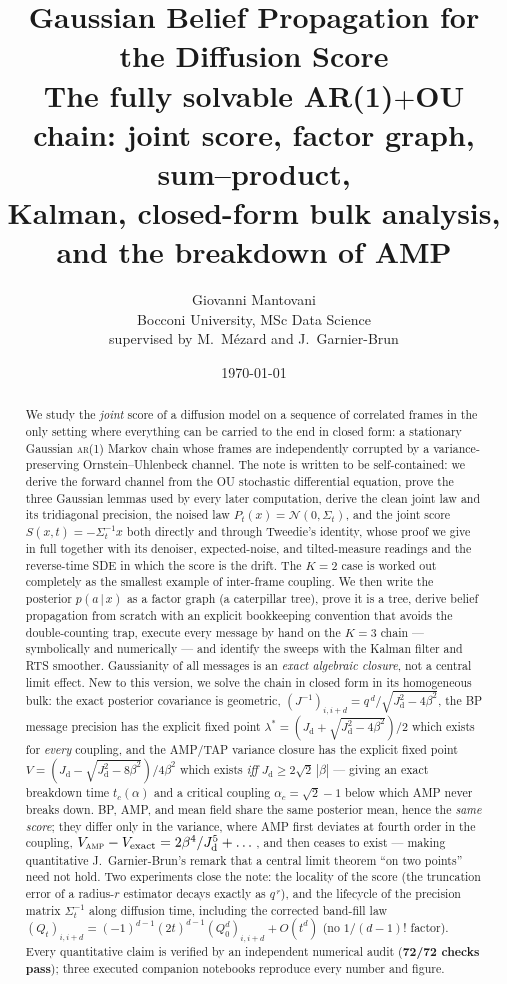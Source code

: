 \documentclass[11pt]{article}
\title{\bfseries Gaussian Belief Propagation for the Diffusion Score\\[2pt]
\large The fully solvable AR(1)$+$OU chain: joint score, factor graph,
sum--product,\\ \large Kalman, closed-form bulk analysis, and the breakdown of AMP}
\author{Giovanni Mantovani\\[2pt]
\small Bocconi University, MSc Data Science\\[1pt]
\small supervised by M.\ M\'ezard and J.\ Garnier-Brun}
\date{\today}
\theoremstyle{definition}
\newcommand{\N}{\mathcal{N}}
\newcommand{\Sig}{\Sigma}
\newcommand{\given}{\,|\,}
\newcommand{\Jd}{J_{\mathrm d}}
\begin{document}
\maketitle

\begin{abstract}
\noindent
We study the \emph{joint} score of a diffusion model on a sequence of
correlated frames in the only setting where everything can be carried to the
end in closed form: a stationary Gaussian \textsc{ar}(1) Markov chain whose
frames are independently corrupted by a variance-preserving
Ornstein--Uhlenbeck channel. The note is written to be self-contained: we
derive the forward channel from the OU stochastic differential equation, prove
the three Gaussian lemmas used by every later computation, derive the clean
joint law and its tridiagonal precision, the noised law
$P_t(x)=\N(0,\Sig_t)$, and the joint score $S(x,t)=-\Sig_t^{-1}x$ both
directly and through Tweedie's identity, whose proof we give in full together
with its denoiser, expected-noise, and tilted-measure readings and the
reverse-time SDE in which the score is the drift. The $K=2$ case is worked out
completely as the smallest example of inter-frame coupling. We then write the
posterior $p(a\given x)$ as a factor graph (a caterpillar tree), prove it is a
tree, derive belief propagation from scratch with an explicit bookkeeping
convention that avoids the double-counting trap, execute every message by hand
on the $K=3$ chain --- symbolically and numerically --- and identify the
sweeps with the Kalman filter and RTS smoother. Gaussianity of all messages is
an \emph{exact algebraic closure}, not a central limit effect. New to this
version, we solve the chain in closed form in its homogeneous bulk: the exact
posterior covariance is geometric, $(J^{-1})_{i,i+d}=q^{\,d}/\sqrt{\Jd^2-4\beta^2}$,
the BP message precision has the explicit fixed point
$\lambda^\ast=(\Jd+\sqrt{\Jd^2-4\beta^2})/2$ which exists for \emph{every}
coupling, and the AMP/TAP variance closure has the explicit fixed point
$V=(\Jd-\sqrt{\Jd^2-8\beta^2})/4\beta^2$ which exists \emph{iff}
$\Jd\ge2\sqrt2\,|\beta|$ --- giving an exact breakdown time $t_c(\alpha)$ and a
critical coupling $\alpha_c=\sqrt2-1$ below which AMP never breaks down. BP,
AMP, and mean field share the same posterior mean, hence the \emph{same
score}; they differ only in the variance, where AMP first deviates at fourth
order in the coupling, $V_{\textsc{amp}}-V_{\mathrm{exact}}=2\beta^4/\Jd^5+\dots$,
and then ceases to exist --- making quantitative J.~Garnier-Brun's remark that
a central limit theorem ``on two points'' need not hold. Two experiments
close the note: the locality of the score (the truncation error of a radius-$r$
estimator decays exactly as $q^{\,r}$), and the lifecycle of the precision
matrix $\Sig_t^{-1}$ along diffusion time, including the corrected band-fill
law $(Q_t)_{i,i+d}=(-1)^{d-1}(2t)^{d-1}(Q_0^d)_{i,i+d}+O(t^d)$ (no
$1/(d-1)!$ factor). Every quantitative claim is verified by an independent
numerical audit (\textbf{72/72 checks pass}); three executed companion
notebooks reproduce every number and figure.
\end{abstract}
\end{document}
